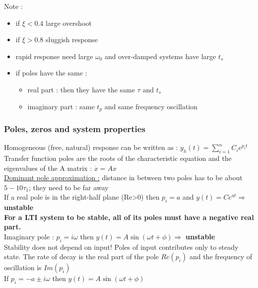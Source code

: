 \documentclass[../main.tex]{subfiles}
\begin{document}
\color{gray} Note : \begin{itemize}
    \item if $\xi < 0.4$ large overshoot\\
    \item if $\xi>0.8$ sluggish response\\
    \item rapid response need large $\omega_0$ and over-damped systems have large $t_s$\\
    \item if poles have the same : \begin{itemize}
        \item real part : then they have the same $\tau$ and $t_s$\\
        \item imaginary part : same $t_p$ and same frequency oscillation\\
    \end{itemize}
\end{itemize}
\color{black}

\subsubsection{Poles, zeros and system properties}
Homogeneous (free, natural) response can be written as : $y_h(t) = \sum_{i=1}^n C_i e^{p_it}$\\
Transfer function poles are the roots of the characteristic equation and the eigenvalues of the A matrix : $\dot{x} = Ax$\\

\quad \underline{Dominant pole approximation :} distance in between two poles has to be about $5-10 \tau_1$; they need to be far away\\

If a real pole is in the right-half plane (Re>0) then $p_i = a$ and $y(t) = Ce^{at} \Rightarrow$ \textbf{unstable}\\

\textbf{For a LTI system to be stable, all of its poles must have a negative real part.}\\

Imaginary pole : $p_i = i \omega$ then $y(t) = A \sin(\omega t + \phi) \Rightarrow$ \textbf{unstable}\\

Stability does not depend on input! Poles of input contributes only to steady state. The rate of decay is the real part of the pole $Re(p_i)$ and the frequency of oscillation is $Im(p_i)$\\
If $p_i = -a \pm i \omega$ then $y(t) = A \sin(\omega t + \phi)$\\
\end{document}
